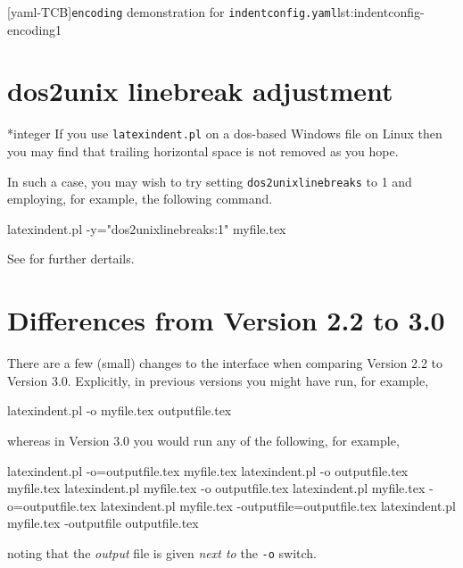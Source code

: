   [yaml-TCB]{\texttt{encoding} demonstration for \texttt{indentconfig.yaml}}{lst:indentconfig-encoding1}

 \section{dos2unix linebreak adjustment}

 *{integer}
  If you use \texttt{latexindent.pl} on a dos-based Windows file on Linux
   then you may find that trailing horizontal
  space is not removed as you hope.

  In such a case, you may wish to try setting \texttt{dos2unixlinebreaks} to 1 and
  employing, for example, the following command.

  \begin{commandshell}
latexindent.pl -y="dos2unixlinebreaks:1" myfile.tex
\end{commandshell}

  See \cite{bersbersbers} for further dertails.

 \section{Differences from Version 2.2 to 3.0}\label{app:differences}
  There are a few (small) changes to the interface when comparing Version 2.2 to Version
  3.0. Explicitly, in previous versions you might have run, for example,

  \begin{commandshell}
latexindent.pl -o myfile.tex outputfile.tex
\end{commandshell}

  whereas in Version 3.0 you would run any of the following, for example,

  \begin{commandshell}
latexindent.pl -o=outputfile.tex myfile.tex
latexindent.pl -o outputfile.tex myfile.tex
latexindent.pl myfile.tex -o outputfile.tex
latexindent.pl myfile.tex -o=outputfile.tex
latexindent.pl myfile.tex -outputfile=outputfile.tex
latexindent.pl myfile.tex -outputfile outputfile.tex
\end{commandshell}

  noting that the \emph{output} file is given \emph{next to} the \texttt{-o} switch.

